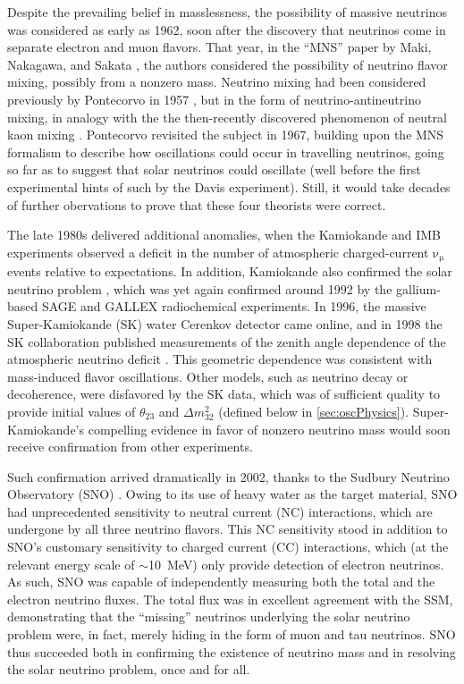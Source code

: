 \documentclass[../thesis.tex]{subfiles}
\begin{document}
Despite the prevailing belief in masslessness, the possibility of massive neutrinos was considered as early as 1962, soon after the discovery that neutrinos come in separate electron and muon flavors. That year, in the ``MNS'' paper by Maki, Nakagawa, and Sakata \cite{10.1143/PTP.28.870}, the authors considered the possibility of neutrino flavor mixing, possibly from a nonzero mass. Neutrino mixing had been considered previously by Pontecorvo in 1957 \cite{Pontecorvo:1957cp}, but in the form of neutrino-antineutrino mixing, in analogy with the the then-recently discovered phenomenon of neutral kaon mixing \cite{PhysRev.105.1925.2}. Pontecorvo revisited the subject in 1967, building upon the MNS formalism to describe how oscillations could occur in travelling neutrinos, going so far as to suggest that solar neutrinos could oscillate (well before the first experimental hints of such by the Davis experiment). Still, it would take decades of further obervations to prove that these four theorists were correct.

The late 1980s delivered additional anomalies, when the Kamiokande \cite{HIRATA1988416} and IMB \cite{PhysRevLett.66.2561} experiments observed a deficit in the number of atmospheric charged-current \(\mathrm{\nu_\mu}\) events relative to expectations. In addition, Kamiokande also confirmed the solar neutrino problem \cite{SUZUKI199554}, which was yet again confirmed around 1992 by the gallium-based SAGE \cite{GAVRIN200136} and GALLEX \cite{VIGNAUD199820} radiochemical experiments. In 1996, the massive Super-Kamiokande (SK) water Cerenkov detector came online, and in 1998 the SK collaboration published measurements of the zenith angle dependence of the atmospheric neutrino deficit \cite{PhysRevLett.81.1562}. This geometric dependence was consistent with mass-induced flavor oscillations. Other models, such as neutrino decay or decoherence, were disfavored by the SK data, which was of sufficient quality to provide initial values of \(\theta_{23}\) and \(\Delta m^2_{32}\) (defined below in \autoref{sec:oscPhysics}). Super-Kamiokande's compelling evidence in favor of nonzero neutrino mass would soon receive confirmation from other experiments.

Such confirmation arrived dramatically in 2002, thanks to the Sudbury Neutrino Observatory (SNO) \cite{PhysRevLett.89.011301}. Owing to its use of heavy water as the target material, SNO had unprecedented sensitivity to neutral current (NC) interactions, which are undergone by all three neutrino flavors. This NC sensitivity stood in addition to SNO's customary sensitivity to charged current (CC) interactions, which (at the relevant energy scale of $\sim$10~MeV) only provide detection of electron neutrinos. As such, SNO was capable of independently measuring both the total and the electron neutrino fluxes. The total flux was in excellent agreement with the SSM, demonstrating that the ``missing'' neutrinos underlying the solar neutrino problem were, in fact, merely hiding in the form of muon and tau neutrinos. SNO thus succeeded both in confirming the existence of neutrino mass and in resolving the solar neutrino problem, once and for all.
\end{document}
